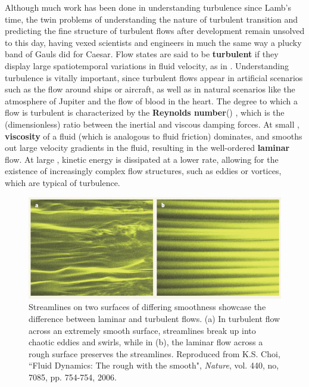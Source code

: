 Although much work has been done in understanding turbulence since Lamb's time, the twin problems of understanding the nature of turbulent transition and predicting the fine structure of turbulent flows after development remain unsolved to this day, having vexed scientists and engineers in much the same way a plucky band of Gauls did for Caesar. Flow states are said to be {\bf turbulent} if they display large spatiotemporal variations in fluid velocity, as in . Understanding turbulence is vitally important, since turbulent flows appear in artificial scenarios such as the flow around ships or aircraft, as well as in natural scenarios like the atmosphere of Jupiter  and the flow of blood in the heart. The degree to which a flow is turbulent is characterized by the {\bf Reynolds number}(\ReN) , which is the (dimensionless) ratio between the inertial and viscous damping forces. At small \ReN, {\bf viscosity} of a fluid (which is analogous to fluid friction) dominates, and smooths out large velocity gradients in the fluid, resulting in the well-ordered {\bf laminar} flow. At large \ReN, kinetic energy is dissipated at a lower rate, allowing for the existence of increasingly complex flow structures, such as eddies or vortices, which are typical of turbulence.
\begin{figure}[h]
\centerline{
\includegraphics[width=\textwidth]{Figs/laminarTurbulent}}
\caption{Streamlines on two surfaces of differing smoothness showcase the difference between laminar and turbulent flows. (a) In turbulent flow across an extremely smooth surface, streamlines break up into chaotic eddies and swirls, while in (b), the laminar flow across a rough surface preserves the streamlines. Reproduced from K.S. Choi, ``Fluid Dynamics: The rough with the smooth", \emph{Nature},  vol. 440, no, 7085, pp. 754-754, 2006.}\label{fig:cylinderWake}
\end{figure}
